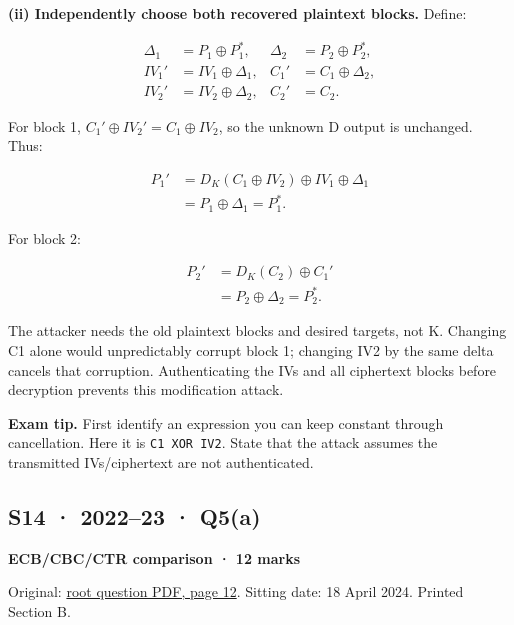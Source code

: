 \documentclass[11pt,a4paper]{article}
\begin{document}
\textbf{(ii) Independently choose both recovered plaintext blocks.} Define:



\[
\begin{aligned}
\Delta_1&=P_1\oplus P_1^*, &\Delta_2&=P_2\oplus P_2^*,\\
IV_1'&=IV_1\oplus\Delta_1, & C_1'&=C_1\oplus\Delta_2,\\
IV_2'&=IV_2\oplus\Delta_2, & C_2'&=C_2.
\end{aligned}
\]

For block 1,\allowbreak{} \(C_1'\oplus IV_2'=C_1\oplus IV_2\),\allowbreak{} so the unknown D output is unchanged. Thus:



\[
\begin{aligned}P_1'&=D_K(C_1\oplus IV_2)\oplus IV_1\oplus\Delta_1\\&=P_1\oplus\Delta_1=P_1^*.\end{aligned}
\]

For block 2:



\[
\begin{aligned}P_2'&=D_K(C_2)\oplus C_1'\\&=P_2\oplus\Delta_2=P_2^*.\end{aligned}
\]

The attacker needs the old plaintext blocks and desired targets,\allowbreak{} not K. Changing C1 alone would unpredictably corrupt block 1; changing IV2 by the same delta cancels that corruption. Authenticating the IVs and all ciphertext blocks before decryption prevents this modification attack.



{\color{ForestGreen}\textbf{Exam tip.} First identify an expression you can keep constant through cancellation. Here it is \texttt{C1 XOR IV2}. State that the attack assumes the transmitted IVs/\allowbreak{}ciphertext are not authenticated.}




\clearpage
\subsection{S14 · 2022–23 · Q5(a)}\label{s14}

\textbf{ECB/\allowbreak{}CBC/\allowbreak{}CTR comparison · 12 marks}


Original: \href{../../CSE405-Security_Merged.pdf\#page=12}{root question PDF,\allowbreak{} page 12}. Sitting date: 18 April 2024. Printed Section B.
\end{document}
